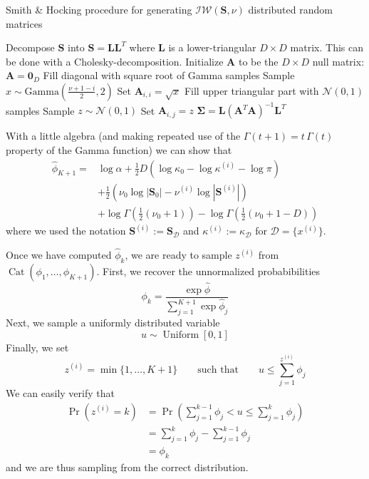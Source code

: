 \documentclass[final,3p,times,twocolumn]{elsarticle}
\DeclareMathOperator*{\Cat}{Cat}
\DeclareMathOperator*{\Uniform}{Uniform}
\let\bs\boldsymbol
\begin{document}
\begin{algorithm}
\caption{Smith \& Hocking procedure \cite{smith1972} for generating $\mathcal{IW}(\bs S,\nu)$ distributed random matrices}
\label{alg:IW}
\begin{algorithmic}[1]
\State Decompose $\bs S$ into $\bs S = \bs L \bs L^T$ where $\bs L$ is a lower-triangular $D \times D$ matrix. This can be done with a Cholesky-decomposition.
\State Initialize $\bs A$ to be the $D\times D$ null matrix: $\bs A = \bs 0_D$
\Statex\State\Comment Fill diagonal with square root of Gamma samples
\State Sample $x \sim \mbox{Gamma}\left(\frac{\nu + 1-i}{2},2\right)$
\State Set $\bs A_{i,i} = \sqrt x$
\EndFor
\Statex\State\Comment Fill upper triangular part with $\mathcal{N}(0,1)$ samples
\State Sample $z \sim \mathcal{N}(0,1)$
\State Set $\bs A_{i,j} = z$
\EndFor
\EndFor
\Statex\State \Return $\bs \Sigma = \bs L \left(\bs A^T \bs A\right)^{-1} \bs L^T$
\end{algorithmic}
\end{algorithm}

With a little algebra (and making repeated use of the $\Gamma(t+1) = t\,\Gamma(t)$ property of the Gamma function) we can show that
\begin{equation}
\begin{split}
\hat \phi_{K+1} = &\log\alpha + \frac{1}{2}D\left(\log\kappa_0 - \log\kappa^{(i)} -\log\pi \right)\\
&+ \frac{1}{2}\left(\nu_0 \log|\bs S_0| - \nu^{(i)} \log|\bs S^{(i)}|\right)\\
&+ \log\Gamma\left(\frac{1}{2}(\nu_0 + 1)\right) - \log\Gamma\left(\frac{1}{2}(\nu_0 + 1 -D)\right)
\end{split}
\end{equation}
where we used the notation $\bs S^{(i)} := \bs S_\mathcal{D}$ and $\kappa^{(i)} := \kappa_\mathcal{D}$ for $\mathcal{D} = \{x^{(i)}\}$.

Once we have computed $\hat\phi_k$, we are ready to sample $z^{(i)}$ from $\Cat(\phi_1,\dots,\phi_{K+1})$.
First, we recover the unnormalized probabibilities
\begin{equation}
\phi_k = \frac{\exp \hat \phi}{\sum_{j=1}^{K+1}\exp\hat\phi_j}
\end{equation}
Next, we sample a uniformly distributed variable
\begin{equation}
u \sim \Uniform[0,1]
\end{equation}
Finally, we set 
\begin{equation}
z^{(i)} = \min\{1,\dots,K+1\} \qquad \mbox{such that}\qquad u \leq \sum_{j=1}^{z^{(i)}} \phi_j
\end{equation}
We can easily verify that 
\begin{equation}
\begin{split}
\Pr\left(z^{(i)} = k\right) &= \Pr\left(\sum_{j=1}^{k-1} \phi_j < u \leq \sum_{j=1}^k \phi_j\right)\\
&= \sum_{j=1}^k \phi_j - \sum_{j=1}^{k-1} \phi_j\\
&= \phi_k
\end{split}
\end{equation}
and we are thus sampling from the correct distribution.
\end{document}
